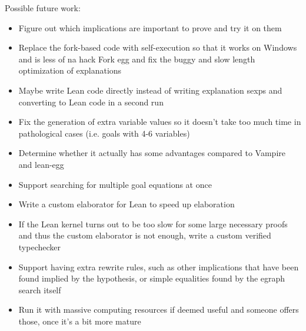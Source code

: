 Possible future work:

\begin{itemize}
	\item Figure out which implications are important to prove and try it on them
	\item Replace the fork-based code with self-execution so that it works on Windows and is less of na hack
	\itme Fork egg and fix the buggy and slow length optimization of explanations
	\item Maybe write Lean code directly instead of writing explanation sexps and converting to Lean code in a second run
	\item Fix the generation of extra variable values so it doesn't take too much time in pathological cases (i.e. goals with 4-6 variables)
	\item Determine whether it actually has some advantages compared to Vampire and lean-egg
	\item Support searching for multiple goal equations at once
	\item Write a custom elaborator for Lean to speed up elaboration
	\item If the Lean kernel turns out to be too slow for some large necessary proofs and thus the custom elaborator is not enough, write a custom verified typechecker
	\item Support having extra rewrite rules, such as other implications that have been found implied by the hypothesis, or simple equalities found by the egraph search itself
	\item Run it with massive computing resources if deemed useful and someone offers those, once it's a bit more mature
\end{itemize}
